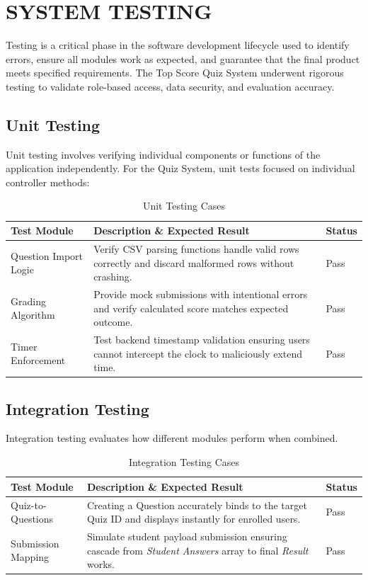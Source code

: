 \chapter{SYSTEM TESTING}

Testing is a critical phase in the software development lifecycle used to identify errors, ensure all modules work as expected, and guarantee that the final product meets specified requirements. The Top Score Quiz System underwent rigorous testing to validate role-based access, data security, and evaluation accuracy.

\section{Unit Testing}
Unit testing involves verifying individual components or functions of the application independently. For the Quiz System, unit tests focused on individual controller methods:

\begin{table}[H]
    \centering
    \begin{tabular}{|p{4cm}|p{7cm}|l|}
        \hline
        \textbf{Test Module} & \textbf{Description \& Expected Result} & \textbf{Status} \\
        \hline
        Question Import Logic & Verify CSV parsing functions handle valid rows correctly and discard malformed rows without crashing. & Pass \\
        \hline
        Grading Algorithm & Provide mock submissions with intentional errors and verify calculated score matches expected outcome. & Pass \\
        \hline
        Timer Enforcement & Test backend timestamp validation ensuring users cannot intercept the clock to maliciously extend time. & Pass \\
        \hline
    \end{tabular}
    \caption{Unit Testing Cases}
    \label{tab:unit_testing}
\end{table}

\section{Integration Testing}
Integration testing evaluates how different modules perform when combined.

\begin{table}[H]
    \centering
    \begin{tabular}{|p{4cm}|p{7cm}|l|}
        \hline
        \textbf{Test Module} & \textbf{Description \& Expected Result} & \textbf{Status} \\
        \hline
        Quiz-to-Questions & Creating a Question accurately binds to the target Quiz ID and displays instantly for enrolled users. & Pass \\
        \hline
        Submission Mapping & Simulate student payload submission ensuring cascade from \textit{Student Answers} array to final \textit{Result} works. & Pass \\
        \hline
    \end{tabular}
    \caption{Integration Testing Cases}
    \label{tab:integration_testing}
\end{table}

